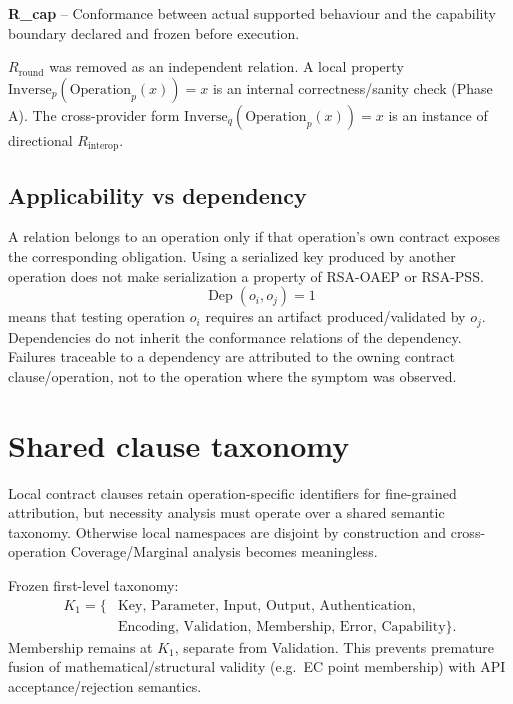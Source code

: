 \documentclass[11pt,a4paper]{article}
\begin{document}
\textbf{R\_cap} -- Conformance between actual supported behaviour and the capability boundary declared and frozen before execution.

$R_{\text{round}}$ was removed as an independent relation. A local property $\text{Inverse}_p(\text{Operation}_p(x))=x$ is an internal correctness/sanity check (Phase A). The cross-provider form $\text{Inverse}_q(\text{Operation}_p(x))=x$ is an instance of directional $R_{\text{interop}}$.

\subsection{Applicability vs dependency}
A relation belongs to an operation only if that operation's own contract exposes the corresponding obligation. Using a serialized key produced by another operation does not make serialization a property of RSA-OAEP or RSA-PSS.
\[\operatorname{Dep}(o_i,o_j)=1\]
means that testing operation $o_i$ requires an artifact produced/validated by $o_j$. Dependencies do not inherit the conformance relations of the dependency. Failures traceable to a dependency are attributed to the owning contract clause/operation, not to the operation where the symptom was observed.

\section{Shared clause taxonomy}
Local contract clauses retain operation-specific identifiers for fine-grained attribution, but necessity analysis must operate over a shared semantic taxonomy. Otherwise local namespaces are disjoint by construction and cross-operation Coverage/Marginal analysis becomes meaningless.

Frozen first-level taxonomy:
\[
\begin{aligned}
K_1=\{&
\text{Key, Parameter, Input, Output, Authentication,}\\
&
\text{Encoding, Validation, Membership, Error, Capability}
\}.
\end{aligned}
\]
Membership remains at $K_1$, separate from Validation. This prevents premature fusion of mathematical/structural validity (e.g.\ EC point membership) with API acceptance/rejection semantics.
\end{document}
